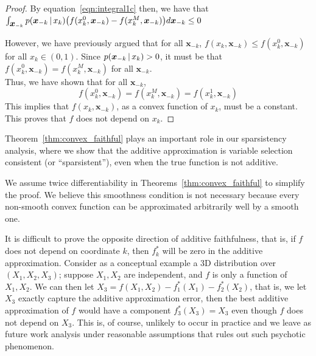 \begin{proof}
By equation~\ref{eqn:integral1c} then, we have that $
\int_{\mbox{\boldmath $x$}_{-k}} p(\mbox{\boldmath $x$}_{-k} {\,|\,} x_k) \big(f(x^0_k, \mbox{\boldmath $x$}_{-k}) -
 f(x^M_k, \mbox{\boldmath $x$}_{-k}) \big) d\mbox{\boldmath $x$}_{-k} \leq 0$

However, we have previously argued that for all $\mathbf{x}_{-k}$, $f(x_k, \mathbf{x}_{-k}) \leq f(x^0_k, \mathbf{x}_{-k})$ for all $x_k \in (0,1)$. Since $p(\mbox{\boldmath $x$}_{-k} {\,|\,} x_k) > 0$, it must be that $f(x^0_k, \mathbf{x}_{-k}) = f(x^M_k, \mathbf{x}_{-k})$ for all $\mathbf{x}_{-k}$.\\

Thus, we have shown that for all $\mathbf{x}_{-k}$, 
\[
f(x^0_k, \mathbf{x}_{-k}) = f(x^M_k, \mathbf{x}_{-k}) = f(x^1_k, \mathbf{x}_{-k})
\]
This implies that $f(x_k, \mathbf{x}_{-k})$, as a convex function of $x_k$, must be a constant. This proves that $f$ does not depend on $x_k$. 
\end{proof}

Theorem~\ref{thm:convex_faithful} plays an important role in our
sparsistency analysis, where we show that the additive
approximation is variable selection consistent (or ``sparsistent''), even when the true function is not
additive.

\begin{remark}
  We assume twice differentiability in
  Theorems~\ref{thm:convex_faithful} to simplify the proof. 
  We believe
  this smoothness condition is not necessary because every non-smooth
  convex function can be approximated arbitrarily well by a smooth
  one.  
\end{remark}

\begin{remark} 
It is difficult to prove the opposite direction of additive faithfulness, that is, if $f$ does not depend on coordinate $k$, then $f_k^*$ will be zero in the additive approximation. Consider as a conceptual example a 3D distribution over $(X_1, X_2, X_3)$; suppose $X_1, X_2$ are independent, and $f$ is only a function of $X_1, X_2$. We can then let $X_3 = f(X_1, X_2) - f^*_1(X_1) - f^*_2(X_2)$, that is, we let $X_3$ exactly capture the additive approximation error, then the best additive approximation of $f$ would have a component $f^*_3(X_3) = X_3$ even though $f$ does not depend on $X_3$. This is, of course, unlikely to occur in practice and we leave as future work analysis under reasonable assumptions that rules out such psychotic phenomenon. 
\end{remark}



 

